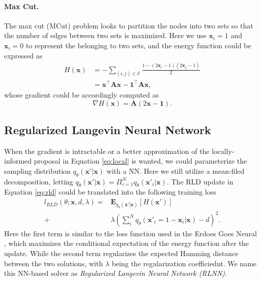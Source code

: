 \paragraph{Max Cut.} The max cut (MCut) problem looks to partition the nodes into two sets so that the number of edges between two sets is maximized. Here we use $\mathbf{x}_i=1$ and $\mathbf{x}_i=0$ to represent the belonging to two sets, and the energy function could be expressed as 
\begin{equation}
\begin{split}
        H(\mathbf{x})&=-\sum_{(i,j)\in\mathcal{E}}\frac{1-(2\mathbf{x}_i-1)(2\mathbf{x}_j-1)}{2}\\
        &=\mathbf{x}^{\top}\mathbf{A}\mathbf{x}-\mathbf{1}^{\top}\mathbf{A}\mathbf{x},
\end{split}
\end{equation}
whose gradient could be accordingly computed as 
\begin{equation}
    \nabla H(\mathbf{x})=\mathbf{A}(2\mathbf{x}-\mathbf{1}).
\end{equation}

\subsection{Regularized Langevin Neural Network}
When the gradient is intractable or a better approximation of the locally-informed proposal in Equation \ref{eq:local} is wanted,
we could parameterize the sampling distribution $q_{\theta}(\mathbf{x}'|\mathbf{x})$ with a NN. Here we still utilize a mean-filed decomposition, letting $q_{\theta}(\mathbf{x}'|\mathbf{x})=\Pi_{i=1}^Nq_{\theta}(\mathbf{x}'_i|\mathbf{x})$. The RLD update in Equation \ref{eq:rld} could be  translated into the following training loss 
\begin{equation}
\label{eq:obj}
\begin{split}
   l_{RLD}(\theta;\mathbf{x},d, \lambda)=&\mathbf{E}_{q_{\theta}(\mathbf{x}'|\mathbf{x})}[H(\mathbf{x}')] \\+ &\lambda(\sum_{i}^N q_{\theta}(\mathbf{x}'_i=1-\mathbf{x}_i|\mathbf{x})-d)^2.
\end{split}
\end{equation}
Here the first term is similar to the loss function used in the Erdoes Goes Neural \citep{Karalias20ERDOES}, which maximizes the conditional expectation of the energy function after the update. While the second term regularizes the expected Hamming distance between the two solutions, with $\lambda$ being the regularization coefficiednt. We name this NN-based solver as \textit{Regularized Langevin Neural Network (RLNN)}.

